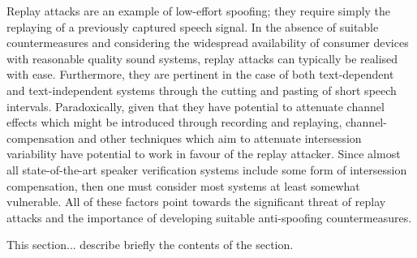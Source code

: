 
Replay attacks are an example of low-effort spoofing; they require simply the replaying of a previously captured speech signal.  
In the absence of suitable countermeasures and considering the widespread availability of consumer devices with reasonable quality sound systems, replay attacks can typically be realised with ease.  
Furthermore, they are pertinent in the case of both text-dependent and text-independent systems through the cutting and pasting of short speech intervals.  
Paradoxically, given that they have potential to attenuate channel effects which might be introduced through recording and replaying, channel-compensation and other techniques which aim to attenuate intersession variability have potential to work in favour of the replay attacker.
Since almost all state-of-the-art speaker verification systems include some form of intersession compensation, then one must consider most systems at least somewhat vulnerable. 
All of these factors point towards the significant threat of replay attacks and the importance of developing suitable anti-spoofing countermeasures.

This section... describe briefly the contents of the section.




%


